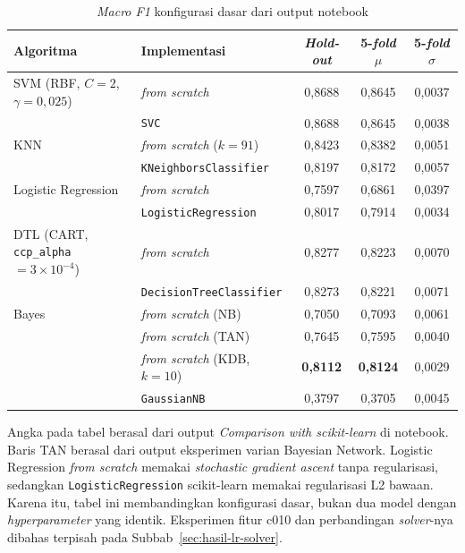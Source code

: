 \begin{table}[H]
	\centering
	\caption{\textit{Macro F1} konfigurasi dasar dari output notebook}
	\label{tab:perbandingan}
	\small
	\begin{tabular}{p{3.3cm} l c c c}
		\toprule
		\textbf{Algoritma} & \textbf{Implementasi} & \textbf{\textit{Hold-out}} & \textbf{5-\textit{fold} $\mu$} & \textbf{5-\textit{fold} $\sigma$} \\
		\midrule
		SVM (RBF, $C=2$, $\gamma=0{,}025$)
		  & \textit{from scratch} & 0,8688 & 0,8645 & 0,0037 \\
		  & \texttt{SVC} & 0,8688 & 0,8645 & 0,0038 \\
		\midrule
		KNN
		  & \textit{from scratch} ($k=91$) & 0,8423 & 0,8382 & 0,0051 \\
		  & \texttt{KNeighborsClassifier} & 0,8197 & 0,8172 & 0,0057 \\
		\midrule
		Logistic Regression
		  & \textit{from scratch} & 0,7597 & 0,6861 & 0,0397 \\
		  & \texttt{LogisticRegression} & 0,8017 & 0,7914 & 0,0034 \\
		\midrule
		DTL (CART, \texttt{ccp\_alpha} $=3\times10^{-4}$)
		  & \textit{from scratch} & 0,8277 & 0,8223 & 0,0070 \\
		  & \texttt{DecisionTreeClassifier} & 0,8273 & 0,8221 & 0,0071 \\
		\midrule
		Bayes
		  & \textit{from scratch} (NB) & 0,7050 & 0,7093 & 0,0061 \\
		  & \textit{from scratch} (TAN) & 0,7645 & 0,7595 & 0,0040 \\
		  & \textit{from scratch} (KDB, $k=10$) & \textbf{0,8112} & \textbf{0,8124} & 0,0029 \\
		  & \texttt{GaussianNB} & 0,3797 & 0,3705 & 0,0045 \\
		\bottomrule
	\end{tabular}
\end{table}

Angka pada tabel berasal dari output \textit{Comparison with scikit-learn}
di notebook. Baris TAN berasal dari output eksperimen varian Bayesian Network.
Logistic Regression \textit{from scratch} memakai \textit{stochastic gradient ascent}
tanpa regularisasi, sedangkan \texttt{LogisticRegression} scikit-learn memakai
regularisasi L2 bawaan. Karena itu, tabel ini membandingkan konfigurasi dasar,
bukan dua model dengan \textit{hyperparameter} yang identik. Eksperimen fitur
c010 dan perbandingan \textit{solver}-nya dibahas terpisah pada
Subbab~\ref{sec:hasil-lr-solver}.

